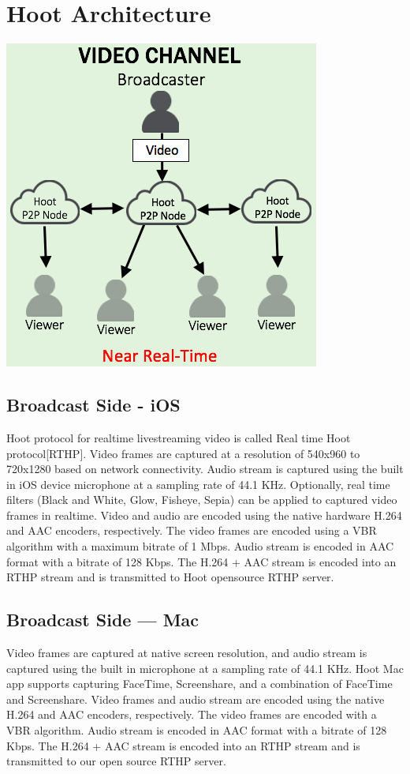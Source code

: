 \section{Hoot Architecture}

\includegraphics[scale=0.5]{hoot-video-architecture-channel}

\subsection{Broadcast Side - iOS}
Hoot protocol for realtime livestreaming video is called Real time Hoot protocol[RTHP].
Video frames are captured at a resolution of 540x960 to 720x1280 based on network connectivity. Audio stream is captured using the built in iOS device microphone at a sampling rate of 44.1 KHz. Optionally, real time filters (Black and White, Glow, Fisheye, Sepia) can be applied to captured video frames in realtime. Video and audio are encoded using the native hardware H.264 and AAC encoders, respectively. The video frames are encoded using a VBR algorithm with a maximum bitrate of 1 Mbps. Audio stream is encoded in AAC format with a bitrate of 128 Kbps. The H.264 + AAC stream is encoded into an RTHP stream and is transmitted to Hoot opensource RTHP server.

\subsection{Broadcast Side — Mac}
Video frames are captured at native screen resolution, and audio stream is captured using the built in microphone at a sampling rate of 44.1 KHz. Hoot Mac app supports capturing FaceTime, Screenshare, and a combination of FaceTime and Screenshare. Video frames and audio stream are encoded using the native H.264 and AAC encoders, respectively. The video frames are encoded with a VBR algorithm. Audio stream is encoded in AAC format with a bitrate of 128 Kbps. The H.264 + AAC stream is encoded into an RTHP stream and is transmitted to our open source RTHP server.

